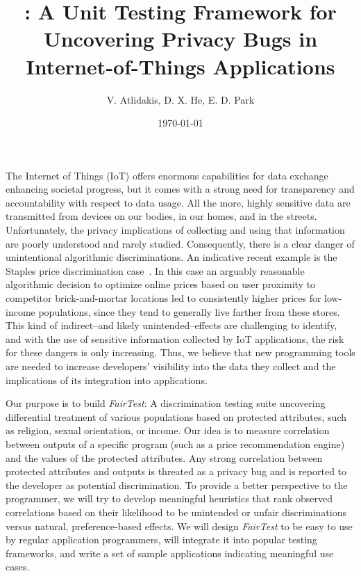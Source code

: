 \documentclass{article}
\title{\thetool: A Unit Testing Framework for Uncovering Privacy Bugs in
  Internet-of-Things Applications}
\author{V. Atlidakis, D. X. He, E. D. Park}
\date{\today}
\newcommand{\thetool}{{\it FairTest}\xspace}
\newcommand{\heading}[1]{\noindent{\bf{#1}}}
\begin{document}
\maketitle

\heading{Motivation.}
The Internet of Things (IoT) offers enormous capabilities for data exchange
enhancing societal progress, but it comes with a strong need for transparency
and accountability with respect to data usage. All the more, highly sensitive
data are transmitted from devices on our bodies, in our homes, and in the
streets. Unfortunately, the privacy implications of collecting and using that
information are poorly understood and rarely studied. Consequently, there is a
clear danger of unintentional algorithmic discriminations. An indicative recent
example is the Staples price discrimination case~\cite{Staples}.
In this case an arguably reasonable algorithmic decision to optimize online
prices based on user proximity to competitor brick-and-mortar locations led to
consistently higher prices for low-income populations, since they tend to
generally live farther from these stores. This kind of indirect--and likely
unintended--effects are challenging to identify, and with the use of sensitive
information collected by IoT applications, the risk for these dangers is only
increasing. Thus, we believe that new programming tools are needed to increase
developers’ visibility into the data they collect and the implications of its
integration into applications.

\heading{Goals.}
Our purpose is to build \thetool: A discrimination testing suite uncovering
differential treatment of various populations based on protected
attributes, such as religion, sexual orientation, or income. Our idea is to
measure correlation between outputs of a specific program (such as a price
recommendation engine) and the values of the protected attributes. Any strong
correlation between protected attributes and outputs is threated as a privacy
bug and is reported to the
developer as potential discrimination. To provide a better perspective to the
programmer, we will try to develop meaningful heuristics that rank observed
correlations based on their likelihood to be unintended or unfair
discriminations versus natural, preference-based effects. We will design
{\it FairTest} to be easy to use by regular application programmers,
will integrate
it into popular testing frameworks, and write a set of sample applications
indicating meaningful use cases.
\end{document}
